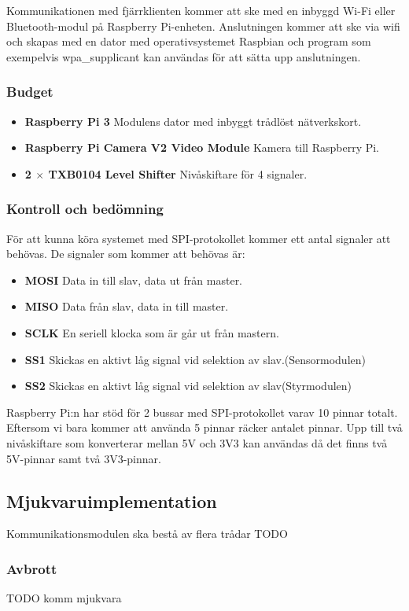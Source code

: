 \documentclass[designspec/spec.tex]{subfiles}
\begin{document}
Kommunikationen med fjärrklienten kommer att ske med en inbyggd Wi-Fi eller
Bluetooth-modul på Raspberry Pi-enheten. Anslutningen kommer att ske via wifi
och skapas med en dator med operativsystemet Raspbian och program som
exempelvis wpa\_supplicant kan användas för att sätta upp anslutningen.

\subsubsection{Budget}
\begin{itemize}
    \item \textbf{Raspberry Pi 3} Modulens dator med inbyggt trådlöst
    nätverkskort.
    \item \textbf{Raspberry Pi Camera V2 Video Module} Kamera till Raspberry
    Pi.
    \item \textbf{2 $\times$ TXB0104 Level Shifter} Nivåskiftare för 4
    signaler.
\end{itemize}

\subsubsection{Kontroll och bedömning}
För att kunna köra systemet med SPI-protokollet kommer ett antal signaler att
behövas. De signaler som kommer att behövas är:
\begin{itemize}
    \item \textbf{MOSI} Data in till slav, data ut från master.
    \item \textbf{MISO} Data från slav, data in till master.
    \item \textbf{SCLK} En seriell klocka som är går ut från mastern.
    \item \textbf{SS1}  Skickas en aktivt låg signal vid selektion av
        slav.(Sensormodulen)
    \item \textbf{SS2}  Skickas en aktivt låg signal vid selektion av
        slav(Styrmodulen)
\end{itemize}

Raspberry Pi:n har stöd för 2 bussar med SPI-protokollet varav 10 pinnar
totalt. Eftersom vi bara kommer att använda 5 pinnar räcker antalet pinnar.
Upp till två nivåskiftare som konverterar mellan 5V och 3V3 kan användas då det
finns två 5V-pinnar samt två 3V3-pinnar.

\subsection{Mjukvaruimplementation}
Kommunikationsmodulen ska bestå av flera trådar TODO

\subsubsection{Avbrott}

TODO komm mjukvara
\end{document}
